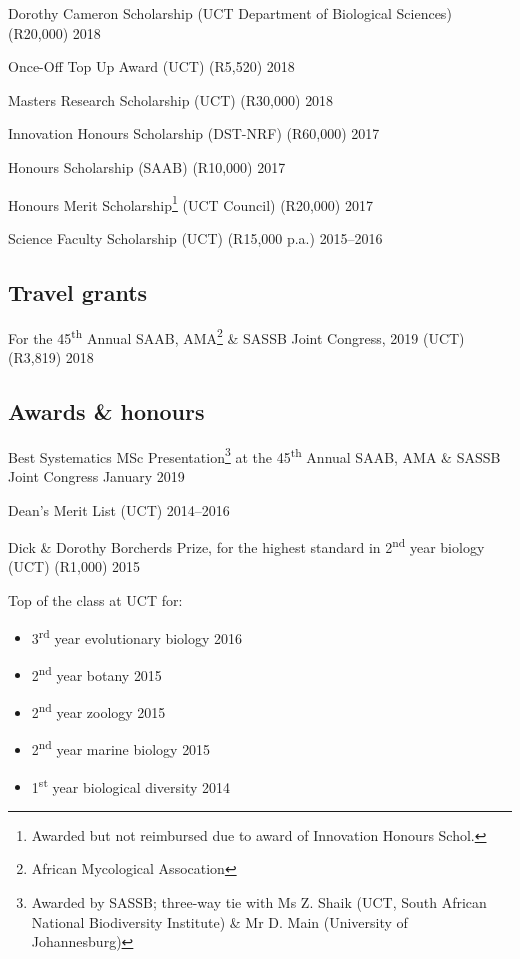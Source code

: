 \documentclass[10pt]{article}
\begin{document}
Dorothy Cameron Scholarship (UCT Department of Biological Sciences) (R20,000)
                                                            \hfill {\small 2018}

Once-Off Top Up Award (UCT) (R5,520)                        \hfill {\small 2018}

Masters Research Scholarship (UCT) (R30,000)                \hfill {\small 2018}

Innovation Honours Scholarship (DST-NRF) (R60,000)          \hfill {\small 2017}

Honours Scholarship (SAAB) (R10,000)                        \hfill {\small 2017}

Honours Merit Scholarship\footnote{Awarded but not reimbursed due to award of 
Innovation Honours Schol.} (UCT Council) (R20,000)          \hfill {\small 2017}

Science Faculty Scholarship (UCT) (R15,000 p.a.)      \hfill {\small 2015--2016}

\subsection*{Travel grants}

For the 45\textsuperscript{th} Annual SAAB, AMA\footnote{African Mycological
Assocation} \& SASSB Joint Congress, 2019 (UCT) (R3,819)    \hfill {\small 2018}

\subsection*{Awards \& honours}

Best Systematics MSc Presentation\footnote{Awarded by SASSB; three-way tie with 
Ms Z. Shaik (UCT, South African National Biodiversity Institute) \& Mr D. Main
(University of Johannesburg)} at the 45\textsuperscript{th} Annual SAAB, AMA \&
SASSB Joint Congress                                \hfill {\small January 2019}

Dean's Merit List (UCT)                               \hfill {\small 2014--2016}

Dick \& Dorothy Borcherds Prize, for the highest standard in 
2\textsuperscript{nd} year biology (UCT) (R1,000)           \hfill {\small 2015}

Top of the class at UCT for:

\begin{itemize}[noitemsep, nolistsep]
  \item 3\textsuperscript{rd} year evolutionary biology     \hfill {\small 2016}
  \item 2\textsuperscript{nd} year botany                   \hfill {\small 2015}
  \item 2\textsuperscript{nd} year zoology                  \hfill {\small 2015}
  \item 2\textsuperscript{nd} year marine biology           \hfill {\small 2015}
  \item 1\textsuperscript{st} year biological diversity     \hfill {\small 2014}
\end{itemize}
\end{document}
